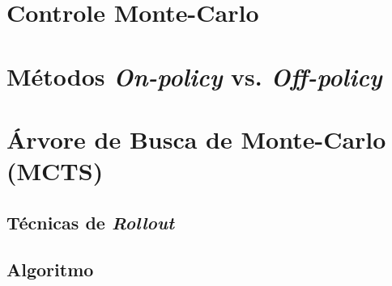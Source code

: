 \documentclass{article}
\begin{document}
\section{Controle Monte-Carlo}

\section{Métodos \textit{On-policy} vs. \textit{Off-policy}}

\section{Árvore de Busca de Monte-Carlo (MCTS)}

    \subsection{Técnicas de \textit{Rollout}}
    
    \subsection{Algoritmo}
\end{document}
